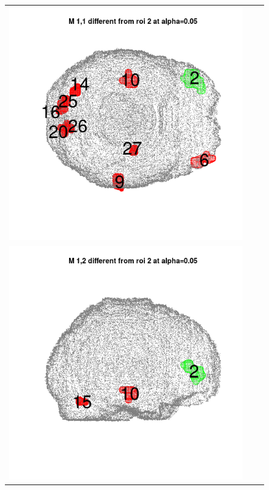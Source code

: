 \documentclass[12pt]{article}
\begin{document}
\begin{figure}[h]
\begin{tabular}{ccc}
\includegraphics[scale = 0.24]{../a7plots/d_1r_2_view3.png} \\ 
\includegraphics[scale = 0.24]{../a7plots/d_2r_2_view1.png} & 

\end{tabular}
\end{figure}
\end{document}
